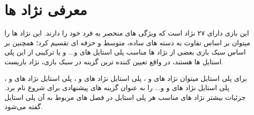 \chapter{معرفی نژاد ها}

این بازی دارای ۲۷ نژاد است که ویژگی های منحصر به فرد خود را دارند.
این نژاد ها را میتوان بر اساس تفاوت به دسته های ساده، متوسط و حرفه ای تقسیم کرد؛ همچنین بر اساس سبک بازی بعضی از نژاد ها مناسب پلی استایل های  و... و یا ترکیبی از این پلی استایل ها هستند، در واقع تعیین کننده ترین گزینه در سبک بازی، نژاد بازیست.

برای پلی استایل  میتوان نژاد های  و ، پلی استایل  نژاد های  و ، پلی استایل  نژاد های  و ، پلی استایل  نژاد های  و  و... را به عنوان گزینه های پیشنهادی برای شروع نام برد. جزئیات بیشتر نژاد های مناسب هر پلی استایل در فصل های مربوط به آن پلی استایل گفته می‌شود.
